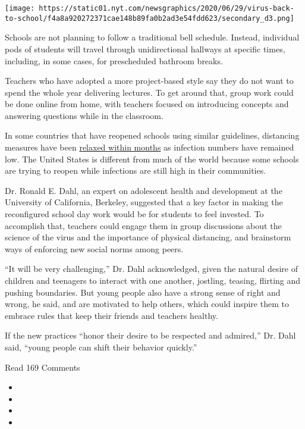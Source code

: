 \texttt{[image: https://static01.nyt.com/newsgraphics/2020/06/29/virus-back-to-school/f4a8a920272371cae148b89fa0b2ad3e54fdd623/secondary\_d3.png]}

Schools are not planning to follow a traditional bell schedule. Instead,
individual pods of students will travel through unidirectional hallways
at specific times, including, in some cases, for prescheduled bathroom
breaks.

Teachers who have adopted a more project-based style say they do not
want to spend the whole year delivering lectures. To get around that,
group work could be done online from home, with teachers focused on
introducing concepts and answering questions while in the classroom.

In some countries that have reopened schools using similar guidelines,
distancing measures have been
\href{https://www.washingtonpost.com/world/europe/schools-reopening-coronavirus/2020/07/10/865fb3e6-c122-11ea-8908-68a2b9eae9e0_story.html}{relaxed
within months} as infection numbers have remained low. The United States
is different from much of the world because some schools are trying to
reopen while infections are still high in their communities.

Dr. Ronald E. Dahl, an expert on adolescent health and development at
the University of California, Berkeley, suggested that a key factor in
making the reconfigured school day work would be for students to feel
invested. To accomplish that, teachers could engage them in group
discussions about the science of the virus and the importance of
physical distancing, and brainstorm ways of enforcing new social norms
among peers.

``It will be very challenging,'' Dr. Dahl acknowledged, given the
natural desire of children and teenagers to interact with one another,
jostling, teasing, flirting and pushing boundaries. But young people
also have a strong sense of right and wrong, he said, and are motivated
to help others, which could inspire them to embrace rules that keep
their friends and teachers healthy.

If the new practices ``honor their desire to be respected and admired,''
Dr. Dahl said, ``young people can shift their behavior quickly.''

Read 169 Comments

\begin{itemize}
\item
\item
\item
\item
\end{itemize}

